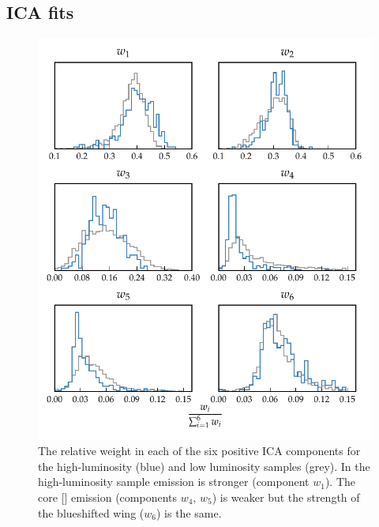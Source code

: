 \subsection{ICA fits}

\begin{figure}
    \includegraphics[width=\textwidth]{figures/chapter04/mfica_component_weights.pdf} 
    \caption[{The relative weight in each of the six positive ICA components for the high-luminosity and low luminosity samples.}]{The relative weight in each of the six positive ICA components for the high-luminosity (blue) and low luminosity samples (grey). In the high-luminosity sample  emission is stronger (component $w_1$). The core [] emission (components $w_4$, $w_5$) is weaker but the strength of the blueshifted wing ($w_6$) is the same.}     
    \label{fig:mfica_component_weights}
\end{figure}

